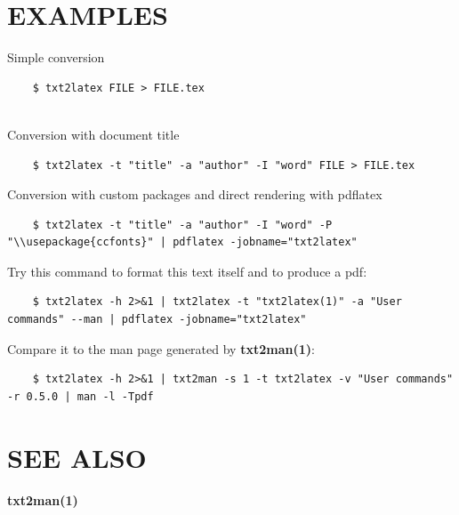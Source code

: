 \documentclass[10pt,notitlepage]{article}
\begin{document}
\section*{EXAMPLES}
Simple conversion

\begin{verbatim}
    $ txt2latex FILE > FILE.tex
  
\end{verbatim}
Conversion with document title

\begin{verbatim}
    $ txt2latex -t "title" -a "author" -I "word" FILE > FILE.tex

\end{verbatim}
Conversion with custom packages and direct rendering with pdflatex

\begin{verbatim}
    $ txt2latex -t "title" -a "author" -I "word" -P "\\usepackage{ccfonts}" | pdflatex -jobname="txt2latex"

\end{verbatim}
Try this command to format this text itself and to produce a pdf:

\begin{verbatim}
    $ txt2latex -h 2>&1 | txt2latex -t "txt2latex(1)" -a "User commands" --man | pdflatex -jobname="txt2latex"

\end{verbatim}
Compare it to the man page generated by \textbf{txt2man(1)}:

\begin{verbatim}
    $ txt2latex -h 2>&1 | txt2man -s 1 -t txt2latex -v "User commands" -r 0.5.0 | man -l -Tpdf

\end{verbatim}
\section*{SEE ALSO}
\textbf{txt2man(1)}
\end{document}

